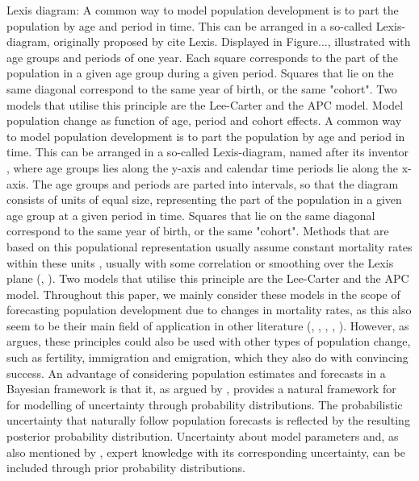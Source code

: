 \newline
\newpar \textcolor{myDarkGreen}{Lexis diagram: A common way to model population development is to part the population by age and period in time. This can be arranged in a so-called Lexis-diagram, originally proposed by cite Lexis. Displayed in Figure..., illustrated with age groups and periods of one year. Each square corresponds to the part of the population in a given age group during a given period. Squares that lie on the same diagonal correspond to the same year of birth, or the same "cohort". Two models that utilise this principle are the Lee-Carter and the APC model. Model population change as function of age, period and cohort effects.}
\newline \newline
A common way to model population development is to part the population by age and period in time. This can be arranged in a so-called Lexis-diagram, named after its inventor \parencite{CZADO2005260}, where age groups lies along the y-axis and calendar time periods lie along the x-axis. The age groups and periods are parted into intervals, so that the diagram consists of units of equal size, representing the part of the population in a given age group at a given period in time. Squares that lie on the same diagonal correspond to the same year of birth, or the same "cohort". Methods that are based on this populational representation usually assume constant mortality rates within these units \parencite{CZADO2005260}, usually with some correlation or smoothing over the Lexis plane (\textcite{CZADO2005260}, \textcite{RieblerThesis2010}). 
\newline
Two models that utilise this principle are the Lee-Carter and the APC model. Throughout this paper, we mainly consider these models in the scope of forecasting population development due to changes in mortality rates, as this also seem to be their main field of application in other literature (\textcite{LeeCarter1992}, \textcite{RieblerThesis2010}, \textcite{CZADO2005260}, \textcite{BROUHNS2002373}, \textcite{RENSHAW2006556}). However, as \textcite{Wisniowski2015} argues, these principles could also be used with other types of population change, such as fertility, immigration and emigration, which they also do with convincing success. 
\newline
\newpar An advantage of considering population estimates and forecasts in a Bayesian framework is that it, as argued by \textcite{Wisniowski2015}, provides a natural framework for for modelling of uncertainty through probability distributions. The probabilistic uncertainty that naturally follow population forecasts is reflected by the resulting posterior probability distribution. Uncertainty about model parameters and, as also mentioned by \textcite{Wisniowski2015}, expert knowledge with its corresponding uncertainty, can be included through prior probability distributions.
